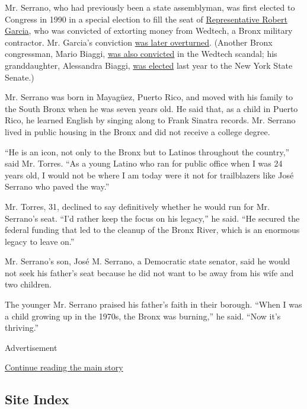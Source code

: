 Mr. Serrano, who had previously been a state assemblyman, was first
elected to Congress in 1990 in a special election to fill the seat of
\href{https://www.nytimes.com/2017/01/26/nyregion/robert-garcia-dead-bronx-congressman.html}{Representative
Robert Garcia}, who was convicted of extorting money from Wedtech, a
Bronx military contractor. Mr. Garcia's conviction
\href{https://www.nytimes.com/1990/06/30/nyregion/garcias-extortion-convictions-are-reversed-by-appeals-panel.html?module=inline}{was
later overturned}. (Another Bronx congressman, Mario Biaggi,
\href{https://www.nytimes.com/2015/06/26/nyregion/mario-biaggi-10-term-new-york-congressman-who-went-to-prison-dies-at-97.html}{was
also convicted} in the Wedtech scandal; his granddaughter, Alessandra
Biaggi,
\href{https://www.nytimes.com/2018/09/13/nyregion/state-senate-election-results-idc-klein.html}{was
elected} last year to the New York State Senate.)

Mr. Serrano was born in Mayagüez, Puerto Rico, and moved with his family
to the South Bronx when he was seven years old. He said that, as a child
in Puerto Rico, he learned English by singing along to Frank Sinatra
records. Mr. Serrano lived in public housing in the Bronx and did not
receive a college degree.

``He is an icon, not only to the Bronx but to Latinos throughout the
country,'' said Mr. Torres. ``As a young Latino who ran for public
office when I was 24 years old, I would not be where I am today were it
not for trailblazers like José Serrano who paved the way.''

Mr. Torres, 31, declined to say definitively whether he would run for
Mr. Serrano's seat. ``I'd rather keep the focus on his legacy,'' he
said. ``He secured the federal funding that led to the cleanup of the
Bronx River, which is an enormous legacy to leave on.''

Mr. Serrano's son, José M. Serrano, a Democratic state senator, said he
would not seek his father's seat because he did not want to be away from
his wife and two children.

The younger Mr. Serrano praised his father's faith in their borough.
``When I was a child growing up in the 1970s, the Bronx was burning,''
he said. ``Now it's thriving.''

Advertisement

\protect\hyperlink{after-bottom}{Continue reading the main story}

\hypertarget{site-index}{%
\subsection{Site Index}\label{site-index}}

